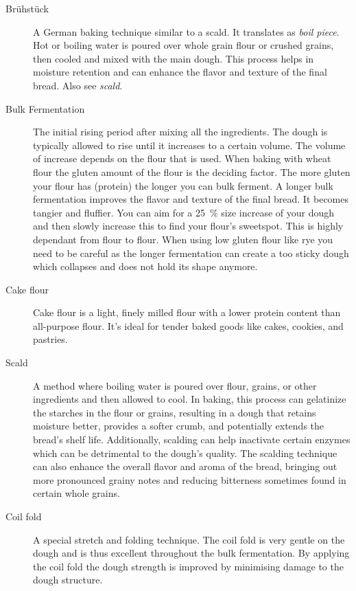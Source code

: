 \begin{description}
\item[Brühstück] A German baking technique similar to a scald. It translates as
\emph{boil piece}. Hot or boiling water is poured over whole grain flour or crushed grains,
then cooled and mixed with the main dough. This process helps in moisture retention
and can enhance the flavor and texture of the final bread. Also see \emph{scald}.

\item[Bulk Fermentation] The initial rising period after mixing all the ingredients.
The dough is typically allowed to rise until it increases to a certain volume. The
volume of increase depends on the flour that is used. When baking with wheat flour
the gluten amount of the flour is the deciding factor. The more gluten your flour has
(protein) the longer you can bulk ferment. A longer bulk fermentation improves the
flavor and texture of the final bread. It becomes tangier and fluffier. You can aim
for a \SI{25}{\percent} size increase of your dough and then slowly increase this to find your
flour’s sweetspot. This is highly dependant from flour to flour. When using low gluten
flour like rye you need to be careful as the longer fermentation can create a too
sticky dough which collapses and does not hold its shape anymore.

\item[Cake flour] Cake flour is a light, finely milled flour with a lower protein
content than all-purpose flour. It's ideal for tender baked goods like cakes, cookies,
and pastries.

\item[Scald] A method where boiling water is poured over flour, grains, or other
ingredients and then allowed to cool. In baking, this process can gelatinize the
starches in the flour or grains, resulting in a dough that retains moisture better,
provides a softer crumb, and potentially extends the bread's shelf life. Additionally,
scalding can help inactivate certain enzymes which can be detrimental to the dough's
quality. The scalding technique can also enhance the overall flavor and aroma of
the bread, bringing out more pronounced grainy notes and reducing bitterness
sometimes found in certain whole grains.

\item[Coil fold] A special stretch and folding technique. The coil fold is
very gentle on the dough and is thus excellent throughout the bulk fermentation.
By applying the coil fold the dough strength is improved by minimising damage
to the dough structure.


\end{description}
